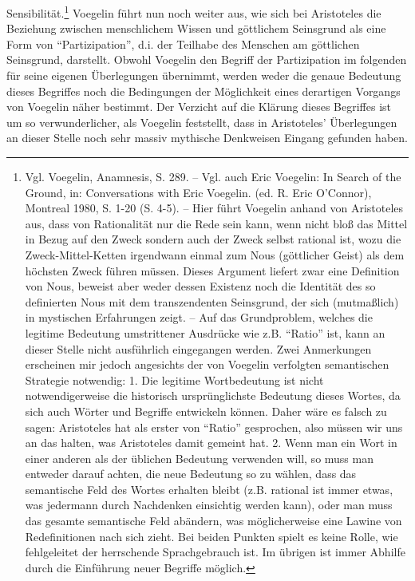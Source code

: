 Sensibilität.\footnote{\label{FussnoteRationalitaet} Vgl.  Voegelin, Anamnesis,
  S. 289.  -- Vgl. auch Eric Voegelin: In Search of the Ground, in:
  Conversations with Eric Voegelin.  (ed. R. Eric O'Connor), Montreal 1980, S.
  1-20 (S. 4-5). -- Hier führt Voegelin anhand von Aristoteles aus, dass von
  Rationalität nur die Rede sein kann, wenn nicht bloß das Mittel in Bezug auf
  den Zweck sondern auch der Zweck selbst rational ist, wozu die
  Zweck-Mittel-Ketten irgendwann einmal zum Nous (göttlicher Geist) als dem
  höchsten Zweck führen müssen. Dieses Argument liefert zwar eine Definition
  von Nous, beweist aber weder dessen Existenz noch die Identität des so
  definierten Nous mit dem transzendenten Seinsgrund, der sich (mutmaßlich) in
  mystischen Erfahrungen zeigt. -- Auf das Grundproblem, welches die legitime
  Bedeutung umstrittener Ausdrücke wie z.B.  "`Ratio"' ist, kann an dieser
  Stelle nicht ausführlich eingegangen werden. Zwei Anmerkungen erscheinen mir
  jedoch angesichts der von Voegelin verfolgten semantischen Strategie
  notwendig: 1. Die legitime Wortbedeutung ist nicht notwendigerweise die
  historisch ursprünglichste Bedeutung dieses Wortes, da sich auch Wörter und
  Begriffe entwickeln können.  Daher wäre es falsch zu sagen: Aristoteles hat
  als erster von "`Ratio"' gesprochen, also müssen wir uns an das halten, was
  Aristoteles damit gemeint hat. 2. Wenn man ein Wort in einer anderen als der
  üblichen Bedeutung verwenden will, so muss man entweder darauf achten, die
  neue Bedeutung so zu wählen, dass das semantische Feld des Wortes erhalten
  bleibt (z.B. rational ist immer etwas, was jedermann durch Nachdenken
  einsichtig werden kann), oder man muss das gesamte semantische Feld
  abändern, was möglicherweise eine Lawine von Redefinitionen nach sich zieht.
  Bei beiden Punkten spielt es keine Rolle, wie fehlgeleitet der herrschende
  Sprachgebrauch ist.  Im übrigen ist immer Abhilfe durch die Einführung neuer
  Begriffe möglich.}  Voegelin führt nun noch weiter aus, wie sich bei
Aristoteles die Beziehung zwischen menschlichem Wissen und göttlichem
Seinsgrund als eine Form von "`Partizipation"', d.i. der Teilhabe des Menschen
am göttlichen Seinsgrund, darstellt. Obwohl Voegelin den Begriff der
Partizipation im folgenden für seine eigenen Überlegungen übernimmt, werden
weder die genaue Bedeutung dieses Begriffes noch die Bedingungen der
Möglichkeit eines derartigen Vorgangs von Voegelin näher bestimmt.  Der
Verzicht auf die Klärung dieses Begriffes ist um so verwunderlicher, als
Voegelin feststellt, dass in Aristoteles' Überlegungen an dieser Stelle noch
sehr massiv mythische Denkweisen Eingang gefunden haben.
 
